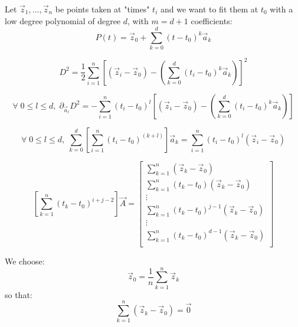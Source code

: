 \documentclass[aps,12pt]{revtex4}
\begin{document}
Let $\vec{z}_1,\ldots,\vec{z}_n$ be points taken at "times" $t_i$ and
we want to fit them at $t_0$ with a low degree polynomial of degree $d$,
with $m=d+1$ coefficients:
\begin{equation}
P(t) = \vec{z}_0 + \sum_{k=0}^{d} \left(t-t_0\right)^k \vec{a}_k
\end{equation}


\begin{equation}
	D^2 = \dfrac{1}{2} \sum_{i=1}^n
	\left[ 
	\left(\vec{z}_i - \vec{z}_0\right) -
	\left(\sum_{k=0}^{d} \left(t_i-t_0\right)^k \vec{a}_k \right)
	 \right]^2
\end{equation}	

\begin{equation}
	\forall\; 0 \leq l \leq d,\;
	\partial_{\vec{a}_l} D^2 =
	-\sum_{i=1}^n  \left(t_i-t_0\right)^l \left[ 
	\left(\vec{z}_i - \vec{z}_0\right) -
	\left(\sum_{k=0}^{d} \left(t_i-t_0\right)^k \vec{a}_k \right)
	 \right]
\end{equation}

\begin{equation}
	\forall\; 0 \leq l \leq d,\;
	\sum_{k=0}^{d} \left[ \sum_{i=1}^n \left(t_i-t_0\right)^{(k+l)} \right] \vec{a}_k = 
	\sum_{i=1}^n \left(t_i-t_0\right)^l  
	\left(\vec{z}_i - \vec{z}_0\right)
\end{equation}

\begin{equation}
\left[ \sum_{k=1}^n (t_k-t_0)^{i+j-2}\right] \vec{A} = 
\begin{bmatrix}
\sum_{k=1}^n\left(\vec{z}_k - \vec{z}_0\right) \\
\sum_{k=1}^n\left(t_k-t_0\right)\left(\vec{z}_k - \vec{z}_0\right)\\
\vdots\\
\sum_{k=1}^n\left(t_k-t_0\right)^{j-1}\left(\vec{z}_k - \vec{z}_0\right)\\
\vdots\\
\sum_{k=1}^n\left(t_k-t_0\right)^{d-1}\left(\vec{z}_k - \vec{z}_0\right)\\
\end{bmatrix}
\end{equation}

We choose:
\begin{equation}
	\vec{z}_0 = \frac{1}{n} \sum_{k=1}^n \vec{z}_k
\end{equation}
so that:
\begin{equation}
	\sum_{k=1}^n\left(\vec{z}_k - \vec{z}_0\right) = \vec{0}
\end{equation}
\end{document}
